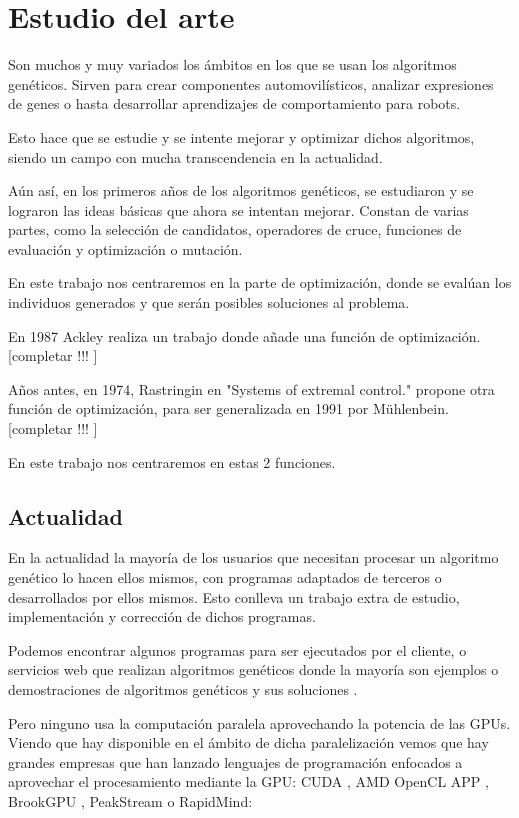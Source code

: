 \chapter{Estudio del arte}
\bigskip

Son muchos y muy variados los ámbitos en los que se usan los algoritmos genéticos. Sirven para crear componentes automovilísticos, analizar expresiones de genes o hasta desarrollar aprendizajes de comportamiento para robots.

Esto hace que se estudie y se intente mejorar y optimizar dichos algoritmos, siendo un campo con mucha transcendencia en la actualidad.

Aún así, en los primeros años de los algoritmos genéticos, se estudiaron y se lograron las ideas básicas que ahora se intentan mejorar. Constan de varias partes, como la selección de candidatos, operadores de cruce, funciones de evaluación y optimización o mutación.

En este trabajo nos centraremos en la parte de optimización, donde se evalúan los individuos generados y que serán posibles soluciones al problema.

En 1987 Ackley realiza un trabajo donde añade una función de optimización.
[completar !!! ]

Años antes, en 1974, Rastringin en "Systems of extremal control." propone otra función de optimización, para ser generalizada en 1991 por Mühlenbein.
[completar !!! ]


En este trabajo nos centraremos en estas 2 funciones.  

\newpage
\section{Actualidad}
\bigskip

En la actualidad la mayoría de los usuarios que necesitan procesar un algoritmo genético lo hacen ellos mismos, con programas adaptados de terceros o desarrollados por ellos mismos. Esto conlleva un trabajo extra de estudio, implementación y corrección de dichos programas. 

Podemos encontrar algunos programas \cite{agpython} \cite{agjava} \cite{agmatlab} para ser ejecutados por el cliente, o servicios web que realizan algoritmos genéticos donde la mayoría son ejemplos o demostraciones de algoritmos genéticos y sus soluciones \cite{agandar} \cite{agcoche}.


Pero ninguno usa la computación paralela aprovechando la potencia de las GPUs. Viendo que hay disponible en el ámbito de dicha paralelización vemos que hay grandes empresas que han lanzado lenguajes de programación enfocados a aprovechar el procesamiento mediante la GPU: CUDA \cite{nvidiacuda}, AMD OpenCL APP \cite{paralelizacionamd}, BrookGPU \cite{brookgpu}, PeakStream o RapidMind:

